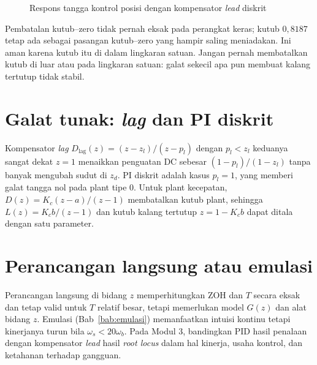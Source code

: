 \begin{figure}[H]
	\centering
	\caption{Respons tangga kontrol posisi dengan kompensator \textit{lead} diskrit}
	\label{fig:b8-lead}
\end{figure}

\begin{catatan}
	Pembatalan kutub--zero tidak pernah eksak pada perangkat keras; kutub $0{,}8187$ tetap ada sebagai pasangan kutub--zero yang hampir saling meniadakan. Ini aman karena kutub itu di dalam lingkaran satuan. Jangan pernah membatalkan kutub di luar atau pada lingkaran satuan: galat sekecil apa pun membuat kalang tertutup tidak stabil.
\end{catatan}

\section{Galat tunak: \textit{lag} dan PI diskrit}
Kompensator \textit{lag} $D_{\text{lag}}(z) = (z - z_l)/(z - p_l)$ dengan $p_l < z_l$ keduanya sangat dekat $z = 1$ menaikkan penguatan DC sebesar $(1-p_l)/(1-z_l)$ tanpa banyak mengubah sudut di $z_d$. PI diskrit adalah kasus $p_l = 1$, yang memberi galat tangga nol pada plant tipe 0. Untuk plant kecepatan, $D(z) = K_c(z - a)/(z-1)$ membatalkan kutub plant, sehingga $L(z) = K_cb/(z-1)$ dan kutub kalang tertutup $z = 1 - K_cb$ dapat ditala dengan satu parameter.

\section{Perancangan langsung atau emulasi}
Perancangan langsung di bidang $z$ memperhitungkan ZOH dan $T$ secara eksak dan tetap valid untuk $T$ relatif besar, tetapi memerlukan model $G(z)$ dan alat bidang $z$. Emulasi (Bab~\ref{bab:emulasi}) memanfaatkan intuisi kontinu tetapi kinerjanya turun bila $\omega_s < 20\omega_b$. Pada Modul 3, bandingkan PID hasil penalaan dengan kompensator \textit{lead} hasil \textit{root locus} dalam hal kinerja, usaha kontrol, dan ketahanan terhadap gangguan.

